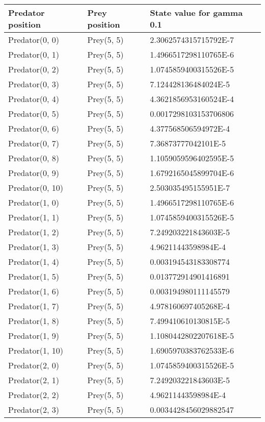 


\begin{longtable}{| p{} | p{} | p{} |} 
   Predator position & Prey position & State value for gamma 0.1 \\
    \hline
 Predator(0, 0) & Prey(5, 5) &2.3062574315715792E-7\\
Predator(0, 1) & Prey(5, 5) &1.4966517298110765E-6\\
Predator(0, 2) & Prey(5, 5) &1.0745859400315526E-5\\
Predator(0, 3) & Prey(5, 5) &7.124428136484024E-5\\
Predator(0, 4) & Prey(5, 5) &4.3621856953160524E-4\\
Predator(0, 5) & Prey(5, 5) &0.0017298103153706806\\
Predator(0, 6) & Prey(5, 5) &4.377568506594972E-4\\
Predator(0, 7) & Prey(5, 5) &7.36873777042101E-5\\
Predator(0, 8) & Prey(5, 5) &1.1059059596402595E-5\\
Predator(0, 9) & Prey(5, 5) &1.6792165045899704E-6\\
Predator(0, 10) & Prey(5, 5) &2.503035495155951E-7\\
Predator(1, 0) & Prey(5, 5) &1.4966517298110765E-6\\
Predator(1, 1) & Prey(5, 5) &1.0745859400315526E-5\\
Predator(1, 2) & Prey(5, 5) &7.249203221843603E-5\\
Predator(1, 3) & Prey(5, 5) &4.96211443598984E-4\\
Predator(1, 4) & Prey(5, 5) &0.003194543183308774\\
Predator(1, 5) & Prey(5, 5) &0.013772914901416891\\
Predator(1, 6) & Prey(5, 5) &0.003194980111145579\\
Predator(1, 7) & Prey(5, 5) &4.978160697405268E-4\\
Predator(1, 8) & Prey(5, 5) &7.499410610130815E-5\\
Predator(1, 9) & Prey(5, 5) &1.1080442802207618E-5\\
Predator(1, 10) & Prey(5, 5) &1.6905970383762533E-6\\
Predator(2, 0) & Prey(5, 5) &1.0745859400315526E-5\\
Predator(2, 1) & Prey(5, 5) &7.249203221843603E-5\\
Predator(2, 2) & Prey(5, 5) &4.96211443598984E-4\\
Predator(2, 3) & Prey(5, 5) &0.0034428456029882547\\

\end{longtable}
